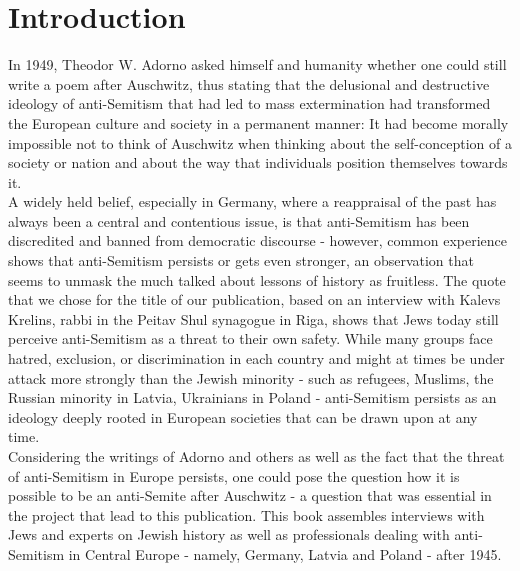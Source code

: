 \section{Introduction}
\vspace*{3em}
In 1949, Theodor W. Adorno asked himself and humanity whether one could still write a poem after Auschwitz, thus stating that the delusional and destructive ideology of anti-Semitism that had led to mass extermination had transformed the European culture and society in a permanent manner: It had become morally impossible not to think of Auschwitz when thinking about the self-conception of a society or nation and about the way that individuals position themselves towards it.\\
A widely held belief, especially in Germany, where a reappraisal of the past has always been a central and contentious issue, is that anti-Semitism has been discredited and banned from democratic discourse - however, common experience shows that anti-Semitism persists or gets even stronger, an observation that seems to unmask the much talked about lessons of history as fruitless. The quote that we chose for the title of our publication, based on an interview with Kalevs Krelins, rabbi in the Peitav Shul synagogue in Riga, shows that Jews today still perceive anti-Semitism as a threat to their own safety. While many groups face hatred, exclusion, or discrimination in each country and might at times be under attack more strongly than the Jewish minority - such as refugees, Muslims, the Russian minority in Latvia, Ukrainians in Poland - anti-Semitism persists as an ideology deeply rooted in European societies that can be drawn upon at any time.\\
Considering the writings of Adorno and others as well as the fact that the threat of anti-Semitism in Europe persists, one could pose the question how it is possible to be an anti-Semite after Auschwitz - a question that was essential in the project that lead to this publication. This book assembles interviews with Jews and experts on Jewish history as well as professionals dealing with anti-Semitism in Central Europe - namely, Germany, Latvia and Poland - after 1945.

